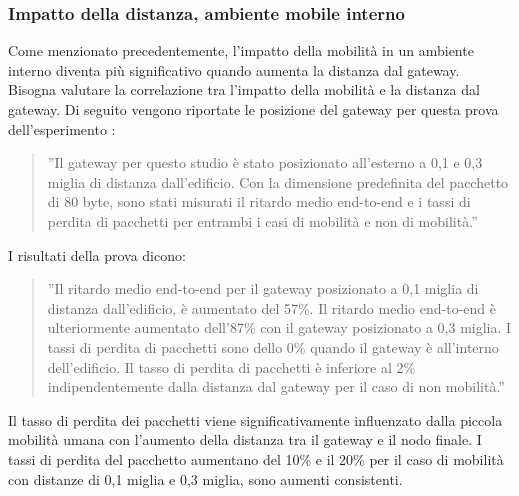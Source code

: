 \documentclass[a4paper]{report} %
\begin{document}
\subsubsection{Impatto della distanza, ambiente mobile interno}
Come menzionato precedentemente, l'impatto della mobilità in un ambiente interno diventa più significativo quando aumenta la distanza dal gateway. Bisogna valutare la correlazione tra l'impatto della mobilità e la distanza dal gateway. 
Di seguito vengono riportate le posizione del gateway per questa prova dell'esperimento \cite{art:rif.47}:
\begin{quote}
	''Il gateway per questo studio è stato posizionato all'esterno a 0,1 e 0,3 miglia di distanza dall'edificio. Con la dimensione predefinita del pacchetto di 80 byte, sono stati misurati il ritardo medio end-to-end e i tassi di perdita di pacchetti per entrambi i casi di mobilità e non di mobilità.''
\end{quote}
I risultati della prova dicono:
\begin{quote}
	''Il ritardo medio end-to-end per il gateway posizionato a 0,1 miglia di distanza dall'edificio, è aumentato del 57\%. Il ritardo medio end-to-end è ulteriormente aumentato dell'87\% con il gateway posizionato a 0,3 miglia.
	I tassi di perdita di pacchetti sono dello 0\% quando il gateway è all'interno dell'edificio. Il tasso di perdita di pacchetti è inferiore al 2\% indipendentemente dalla distanza dal gateway per il caso di non mobilità.''
\end{quote}
Il tasso di perdita dei pacchetti viene significativamente influenzato dalla piccola mobilità umana con l'aumento della distanza tra il gateway e il nodo finale. I tassi di perdita del pacchetto aumentano del 10\% e il 20\% per il caso di mobilità con distanze di 0,1 miglia e 0,3 miglia, sono aumenti consistenti.
\end{document}
